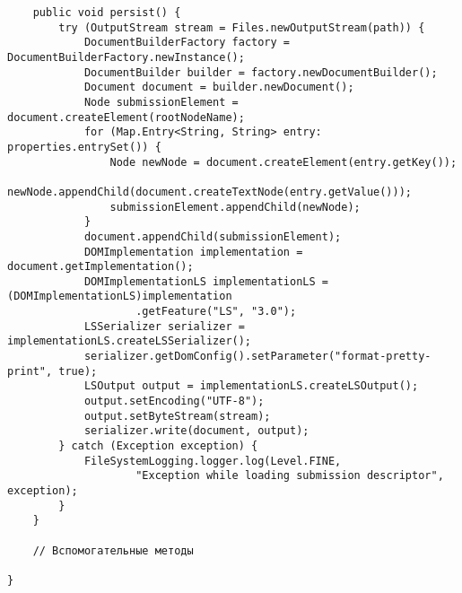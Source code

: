 \begin{verbatim}
    public void persist() {
        try (OutputStream stream = Files.newOutputStream(path)) {
            DocumentBuilderFactory factory = DocumentBuilderFactory.newInstance();
            DocumentBuilder builder = factory.newDocumentBuilder();
            Document document = builder.newDocument();
            Node submissionElement = document.createElement(rootNodeName);
            for (Map.Entry<String, String> entry: properties.entrySet()) {
                Node newNode = document.createElement(entry.getKey());
                newNode.appendChild(document.createTextNode(entry.getValue()));
                submissionElement.appendChild(newNode);
            }
            document.appendChild(submissionElement);
            DOMImplementation implementation = document.getImplementation();
            DOMImplementationLS implementationLS = (DOMImplementationLS)implementation
                    .getFeature("LS", "3.0");
            LSSerializer serializer = implementationLS.createLSSerializer();
            serializer.getDomConfig().setParameter("format-pretty-print", true);
            LSOutput output = implementationLS.createLSOutput();
            output.setEncoding("UTF-8");
            output.setByteStream(stream);
            serializer.write(document, output);
        } catch (Exception exception) {
            FileSystemLogging.logger.log(Level.FINE,
                    "Exception while loading submission descriptor", exception);
        }
    }
    
    // Вспомогательные методы
    
}
\end{verbatim}